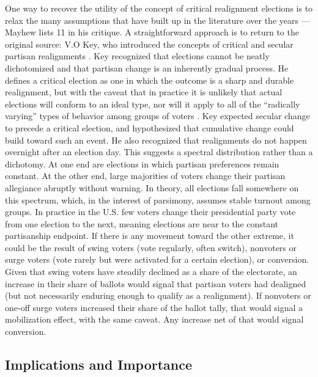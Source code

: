 One way to recover the utility of the concept of critical realignment elections is to relax the many assumptions that have built up in the literature over the years --- Mayhew lists 11 in his critique. A straightforward approach is to return to the original source: V.O Key, who introduced the concepts of critical and secular partisan realignments \citep{key_jr_theory_1955, key_jr_secular_1959}. Key recognized that elections cannot be neatly dichotomized and that partisan change is an inherently gradual process. He defines a critical election as one in which the outcome is a sharp and durable realignment, but with the caveat that in practice it is unlikely that actual elections will conform to an ideal type, nor will it apply to all of the ``radically varying'' types of behavior among groups of voters \citep{key_jr_theory_1955}. Key expected secular change to precede a critical election, and hypothesized that cumulative change could build toward such an event. He also recognized that realignments do not happen overnight after an election day. This suggests a spectral distribution rather than a dichotomy. At one end are elections in which partisan preferences remain constant. At the other end, large majorities of voters change their partisan allegiance abruptly without warning. In theory, all elections fall somewhere on this spectrum, which, in the interest of parsimony, assumes stable turnout among groups. In practice in the U.S. few voters change their presidential party vote from one election to the next, meaning elections are near to the constant partisanship endpoint. If there is any movement toward the other extreme, it could be the result of swing voters (vote regularly, often switch), nonvoters or surge voters (vote rarely but were activated for a certain election), or conversion. Given that swing voters have steadily declined as a share of the electorate, an increase in their share of ballots would signal that partisan voters had dealigned (but not necessarily enduring enough to qualify as a realignment). If nonvoters or one-off surge voters increased their share of the ballot tally, that would signal a mobilization effect, with the same caveat. Any increase net of that would signal conversion. 

\subsection{Implications and Importance}

